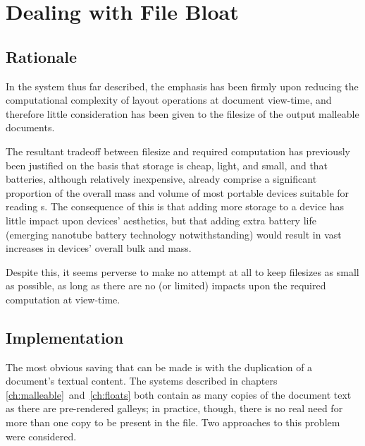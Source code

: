 \chapter{Dealing with File Bloat}\label{ch:bloat}

\section{Rationale}
In the system thus far described, the emphasis has been firmly upon reducing the computational complexity of layout operations at document view-time, and therefore little consideration has been given to the filesize of the output malleable documents.


The resultant tradeoff between filesize and required computation has previously been justified on the basis that storage is cheap, light, and small, and that batteries, although relatively inexpensive, already comprise a significant proportion of the overall mass and volume of most portable devices suitable for reading \ebook{}s. The consequence of this is that adding more storage to a device has little impact upon devices' aesthetics, but that adding extra battery life (emerging nanotube battery technology notwithstanding) would result in vast increases in devices' overall bulk and mass.

Despite this, it seems perverse to make no attempt at all to keep filesizes as small as possible, as long as there are no (or limited) impacts upon the required computation at view-time.



\section{Implementation}
The most obvious saving that can be made is with the duplication of a document's textual content. The systems described in chapters \ref{ch:malleable}~and~\ref{ch:floats} both contain as many copies of the document text as there are pre-rendered galleys; in practice, though, there is no real need for more than one copy to be present in the file. Two approaches to this problem were considered.

